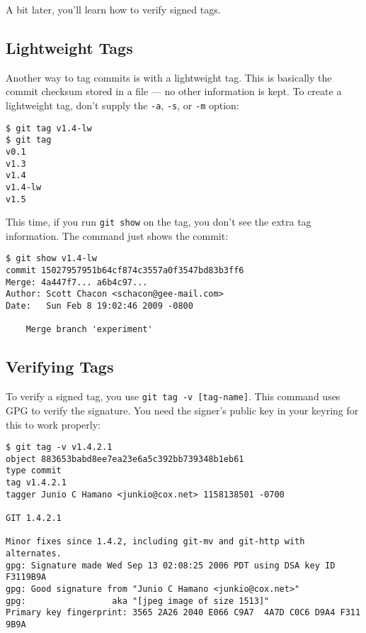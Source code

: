 \documentclass[a4paper]{book}
\begin{document}
A bit later, you'll learn how to verify signed tags.

\subsection{Lightweight Tags}

Another way to tag commits is with a lightweight tag. This is basically the commit checksum stored in a file --- no other information is kept. To create a lightweight tag, don't supply the \texttt{-a}, \texttt{-s}, or \texttt{-m} option:

\begin{shaded}\begin{verbatim}
$ git tag v1.4-lw
$ git tag
v0.1
v1.3
v1.4
v1.4-lw
v1.5
\end{verbatim}\end{shaded}

This time, if you run \texttt{git show} on the tag, you don't see the extra tag information. The command just shows the commit:

\begin{shaded}\begin{verbatim}
$ git show v1.4-lw
commit 15027957951b64cf874c3557a0f3547bd83b3ff6
Merge: 4a447f7... a6b4c97...
Author: Scott Chacon <schacon@gee-mail.com>
Date:   Sun Feb 8 19:02:46 2009 -0800

    Merge branch 'experiment'
\end{verbatim}\end{shaded}

\subsection{Verifying Tags}

To verify a signed tag, you use \texttt{git tag -v {[}tag-name{]}}. This command uses GPG to verify the signature. You need the signer's public key in your keyring for this to work properly:

\begin{shaded}\begin{verbatim}
$ git tag -v v1.4.2.1
object 883653babd8ee7ea23e6a5c392bb739348b1eb61
type commit
tag v1.4.2.1
tagger Junio C Hamano <junkio@cox.net> 1158138501 -0700

GIT 1.4.2.1

Minor fixes since 1.4.2, including git-mv and git-http with alternates.
gpg: Signature made Wed Sep 13 02:08:25 2006 PDT using DSA key ID F3119B9A
gpg: Good signature from "Junio C Hamano <junkio@cox.net>"
gpg:                 aka "[jpeg image of size 1513]"
Primary key fingerprint: 3565 2A26 2040 E066 C9A7  4A7D C0C6 D9A4 F311 9B9A
\end{verbatim}\end{shaded}
\end{document}
